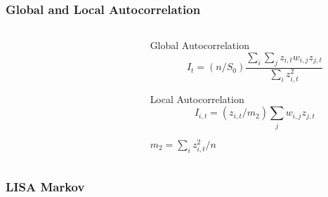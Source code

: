 \documentclass{beamer}
\begin{document}
\begin{frame}\frametitle{Global and Local Autocorrelation}
  \begin{columns}
  \begin{column}[l]{3cm}
 
\begin{center}
     \begin{figure}
      \end{figure}      
\end{center}
 
  \end{column}
  \begin{column}[r]{7cm}
    Global Autocorrelation
    \begin{equation}
    I_t =  (n/S_0) \frac{\sum_i \sum_j z_{i,t} w_{i,j} z_{j,t}}{\sum_i
    z_{i,t}^2}
    \end{equation}

    Local Autocorrelation
    \begin{equation}
    I_{i,t} =  (z_{i,t}/m_2) \sum_j w_{i,j} z_{j,t}
  \end{equation}

  $m_2 = \sum_i z_{i,t}^2 / n$
  \end{column}
  \end{columns}
\end{frame}

\begin{frame}\frametitle{LISA Markov}
  \begin{columns}
  \begin{column}[l]{6cm}
 
\begin{center}
     \begin{figure}
      \end{figure}      
\end{center}
 
  \end{column}
  \begin{column}[r]{6cm}
 \begin{figure}
      \end{figure}      

  \end{column}
  \end{columns}
\end{frame}
\end{document}
